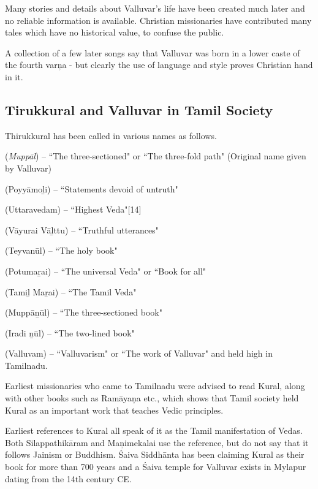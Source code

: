 Many stories and details about Valluvar’s life have been created much later and no reliable information is available. Christian missionaries have contributed many tales which have no historical value, to confuse the public.

A collection of a few later songs say that Valluvar was born in a lower caste of the fourth varņa - but clearly the use of language and style proves Christian hand in it.

\subsection*{Tirukkural and Valluvar in Tamil Society}

Thirukkural has been called in various names as follows.

 (\textit{Muppāl}) – “The three-sectioned" or “The three-fold path" (Original name given by Valluvar)

 (Poyyāmoḻi) – “Statements devoid of untruth"

 (Uttaravedam) – “Highest Veda"[14]

 (Vāyurai Vāḻttu) – “Truthful utterances"

 (Teyvanūl) – “The holy book"

 (Potumaṟai) – “The universal Veda" or “Book for all"

 (Tamiḻ Maṟai) – “The Tamil Veda"

 (Muppāṉūl) – “The three-sectioned book"

 (Iradi ṉūl) – “The two-lined book"

 (Valluvam) – “Valluvarism" or “The work of Valluvar" and held high in Tamilnadu.

Earliest missionaries who came to Tamilnadu were advised to read Kural, along with other books such as Ramāyaņa etc., which shows that Tamil society held Kural as an important work that teaches Vedic principles.

Earliest references to Kural all speak of it as the Tamil manifestation of Vedas. Both Silappathikāram and Maņimekalai use the reference, but do not say that it follows Jainism or Buddhism. Śaiva Siddhānta has been claiming Kural as their book for more than 700 years and a Śaiva temple for Valluvar exists in Mylapur dating from the 14th century CE.

